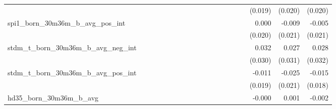 \begin{tabular}{lrrrrrrrrrrrrrrrrrr}
                                            &              &              &              &              &              &              &              &              &               &              &              &               &              &              &               &      (0.019) &      (0.020) &       (0.020) \\ 
spi1\_born\_30m36m\_b\_avg\_pos\_int        &              &              &              &              &              &              &              &              &               &              &              &               &              &              &               &        0.000 &       -0.009 &        -0.005 \\ 
                                            &              &              &              &              &              &              &              &              &               &              &              &               &              &              &               &      (0.020) &      (0.021) &       (0.021) \\ 
stdm\_t\_born\_30m36m\_b\_avg\_neg\_int     &              &              &              &              &              &              &              &              &               &              &              &               &              &              &               &        0.032 &        0.027 &         0.028 \\ 
                                            &              &              &              &              &              &              &              &              &               &              &              &               &              &              &               &      (0.030) &      (0.031) &       (0.032) \\ 
stdm\_t\_born\_30m36m\_b\_avg\_pos\_int     &              &              &              &              &              &              &              &              &               &              &              &               &              &              &               &       -0.011 &       -0.025 &        -0.015 \\ 
                                            &              &              &              &              &              &              &              &              &               &              &              &               &              &              &               &      (0.019) &      (0.021) &       (0.018) \\ 
hd35\_born\_30m36m\_b\_avg                  &              &              &              &              &              &              &              &              &               &              &              &               &              &              &               &       -0.000 &        0.001 &        -0.002 \\ 

\end{tabular}
